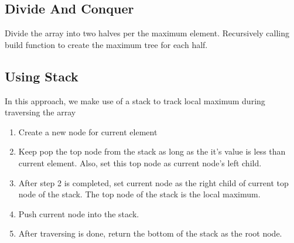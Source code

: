 \subsection{Divide And Conquer}
Divide the array into two halves per the maximum element. Recursively calling build function to create the maximum tree for each half.

\subsection{Using Stack}
In this approach, we make use of a stack to track local maximum during traversing the array
\begin{enumerate}
\item Create a new node for current element
\item Keep pop the top node from the stack as long as the it's value is less than current element. Also, set this top node as current node's left child.
\item After step 2 is completed, set current node as the right child of current top node of the stack. The top node of the stack is the local maximum.
\item Push current node into the stack.
\item After traversing is done, return the bottom of the stack as the root node.
\end{enumerate}
